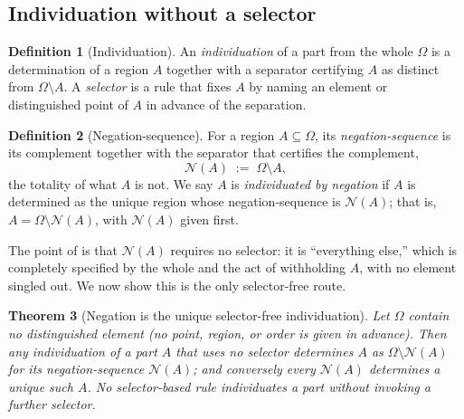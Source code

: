 \documentclass[11pt,a4paper]{article}
\theoremstyle{thmstyle}
\newtheorem{theorem}{Theorem}[section]
\theoremstyle{definition}
\newtheorem{definition}[theorem]{Definition}
\theoremstyle{remark}
\newcommand{\Space}{\Omega}
\newcommand{\Neg}{\mathcal{N}}
\begin{document}
\subsection{Individuation without a selector}

\begin{definition}[Individuation]
\label{def:individuation}
An \emph{individuation} of a part from the whole $\Space$ is a determination of a
region $A$ together with a separator certifying $A$ as distinct from
$\Space\setminus A$. A \emph{selector} is a rule that fixes $A$ by naming an
element or distinguished point of $A$ in advance of the separation.
\end{definition}

\begin{definition}[Negation-sequence]
\label{def:negation}
For a region $A\subseteq\Space$, its \emph{negation-sequence} is its complement
together with the separator that certifies the complement,
\[
\Neg(A)\;:=\;\Space\setminus A,
\]
the totality of what $A$ is not. We say $A$ is \emph{individuated by negation}
if $A$ is determined as the unique region whose negation-sequence is $\Neg(A)$;
that is, $A=\Space\setminus\Neg(A)$, with $\Neg(A)$ given first.
\end{definition}

The point of  is that $\Neg(A)$ requires no selector: it is
``everything else,'' which is completely specified by the whole and the act of
withholding $A$, with no element singled out. We now show this is the only
selector-free route.

\begin{theorem}[Negation is the unique selector-free individuation]
\label{thm:negation-unique}
Let $\Space$ contain no distinguished element \textup{(}no point, region, or
order is given in advance\textup{)}. Then any individuation of a part $A$ that
uses no selector determines $A$ as $\Space\setminus\Neg(A)$ for its
negation-sequence $\Neg(A)$; and conversely every $\Neg(A)$ determines a unique
such $A$. No selector-based rule individuates a part without invoking a further
selector.
\end{theorem}
\end{document}

